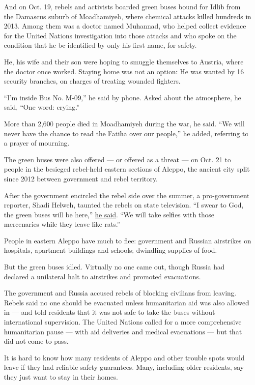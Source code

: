 And on Oct. 19, rebels and activists boarded green buses bound for Idlib
from the Damascus suburb of Moadhamiyeh, where chemical attacks killed
hundreds in 2013. Among them was a doctor named Muhannad, who helped
collect evidence for the United Nations investigation into those attacks
and who spoke on the condition that he be identified by only his first
name, for safety.

He, his wife and their son were hoping to smuggle themselves to Austria,
where the doctor once worked. Staying home was not an option: He was
wanted by 16 security branches, on charges of treating wounded fighters.

``I'm inside Bus No. M-09,'' he said by phone. Asked about the
atmosphere, he said, ``One word: crying.''

More than 2,600 people died in Moadhamiyeh during the war, he said. ``We
will never have the chance to read the Fatiha over our people,'' he
added, referring to a prayer of mourning.

The green buses were also offered --- or offered as a threat --- on Oct.
21 to people in the besieged rebel-held eastern sections of Aleppo, the
ancient city split since 2012 between government and rebel territory.

After the government encircled the rebel side over the summer, a
pro-government reporter, Shadi Helweh, taunted the rebels on state
television. ``I swear to God, the green buses will be here,''
\href{https://www.facebookcorewwwi.onion/syrian.reporters/videos/vb.254488777930036/1114638088581763/?type=2\&theater}{he
said}. ``We will take selfies with those mercenaries while they leave
like rats.''

People in eastern Aleppo have much to flee: government and Russian
airstrikes on hospitals, apartment buildings and schools; dwindling
supplies of food.

But the green buses idled. Virtually no one came out, though Russia had
declared a unilateral halt to airstrikes and promoted evacuations.

The government and Russia accused rebels of blocking civilians from
leaving. Rebels said no one should be evacuated unless humanitarian aid
was also allowed in --- and told residents that it was not safe to take
the buses without international supervision. The United Nations called
for a more comprehensive humanitarian pause --- with aid deliveries and
medical evacuations --- but that did not come to pass.

It is hard to know how many residents of Aleppo and other trouble spots
would leave if they had reliable safety guarantees. Many, including
older residents, say they just want to stay in their homes.

